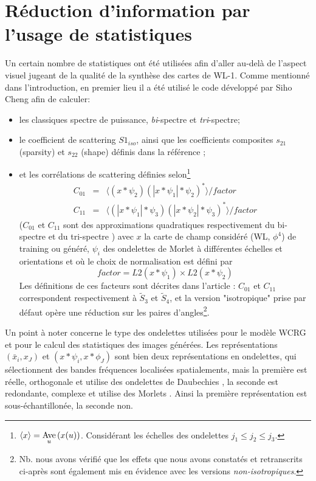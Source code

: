 \documentclass[12pt,twoside]{article}
\newcommand{\Av}[1] {\underset {#1} {\rm Ave}\,}
\newcommand{\itemb}{\item[$\bullet$]}
\begin{document}
\section{Réduction d'information par l'usage de statistiques}
\label{sec-summary-stat}
%
Un certain nombre de statistiques ont été utilisées afin d'aller au-delà de l'aspect visuel jugeant de la qualité de la synthèse des cartes de WL-1. Comme mentionné dans l'introduction, en premier lieu il a été utilisé le code développé par Siho Cheng afin de calculer:
\begin{itemize}
\itemb les classiques spectre de puissance, \textit{bi}-spectre et \textit{tri}-spectre; 
\itemb le coefficient de scattering $S1_{iso}$, ainsi que les coefficients composites $s_{21}$ (sparsity) et $s_{22}$ (shape) définis dans la référence \cite{2021arXiv211201288C}; 
\itemb et les corrélations de scattering définies selon\footnote{$\langle x \rangle =\Av{u}(x(u))$. Considérant les échelles des ondelettes $j_1\leq j_2\leq j_3$.}
\begin{eqnarray}
 C_{01} &=& \langle(x \ast \psi_2)(|x \ast \psi_1| \ast \psi_2)^\ast\rangle / factor \\
 C_{11} &=& \langle(|x \ast \psi_1| * \psi_3)(|x * \psi_2| * \psi_3)^\ast\rangle / factor
\end{eqnarray}
($C_{01}$ et  $C_{11}$ sont des approximations quadratiques respectivement du bi-spectre et du tri-spectre \citep{2023arXiv230617210C})
avec $x$ la carte de champ considéré (WL, $\phi^4$) de training ou généré, $\psi_i$ des ondelettes de Morlet à différentes échelles et orientations et où le choix de normalisation est défini par
\begin{equation}
factor = L2(x \ast \psi_1) \times L2(x \ast \psi_2)
\end{equation}
Les définitions de ces facteurs sont décrites dans l'article \cite{2023arXiv230617210C}: $C_{01}$ et $C_{11}$ correspondent respectivement à $\tilde{S}_3$ et $\tilde{S}_4$, et la version "isotropique" prise par défaut opère une réduction sur les paires d'angles\footnote{Nb. nous avons vérifié que les effets que nous avons constatés et retranscrits ci-après sont également mis en évidence avec les versions \textit{non-isotropiques}.}. 
\end{itemize}
\hfill

Un point à noter concerne le type des ondelettes utilisées pour le modèle WCRG et pour le calcul des statistiques des images générées. Les représentations $(\bar x_i,x_J)$ et $(x*\psi_i,x*\phi_J)$ sont bien deux représentations en ondelettes, qui sélectionnent des bandes fréquences localisées spatialements, mais la première est réelle, orthogonale et utilise des ondelettes de Daubechies \cite{STEPHANE2009263}, la seconde est redondante, complexe et utilise des Morlets \cite{Meyer}. Ainsi la première représentation est sous-échantillonée, la seconde non. 
\end{document}
